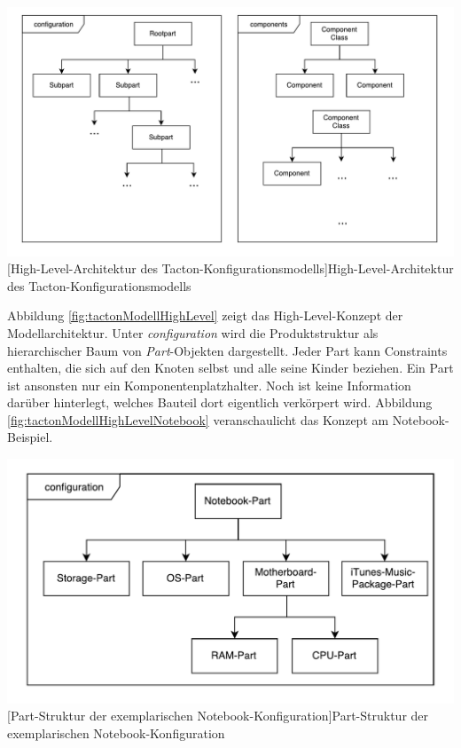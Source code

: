 \documentclass[11pt, a4paper, titlepage, listof=totoc, bibliography=totoc, index=totoc, twoside, openright, headings=normal, draft]{scrreprt}
\begin{document}
\vspace{1em}
\begin{minipage}{\linewidth}
	\centering
	\includegraphics[width=1\linewidth]{Abbildungen/tactonModellHighLevel.pdf}
	[High-Level-Architektur des Tacton-Konfigurationsmodells]{High-Level-Architektur des Tacton-Konfigurationsmodells}
	\label{fig:tactonModellHighLevel}
\end{minipage}
\vspace{0.3em}

Abbildung \ref{fig:tactonModellHighLevel} zeigt das High-Level-Konzept der Modellarchitektur. Unter \emph{configuration} wird die Produktstruktur als hierarchischer Baum von \emph{Part}-Objekten dargestellt. Jeder Part kann Constraints enthalten, die sich auf den Knoten selbst und alle seine Kinder beziehen. Ein Part ist ansonsten nur ein Komponentenplatzhalter. Noch ist keine Information darüber hinterlegt, welches Bauteil dort eigentlich verkörpert wird. Abbildung \ref{fig:tactonModellHighLevelNotebook} veranschaulicht das Konzept am Notebook-Beispiel.

\vspace{1em}
\begin{minipage}{\linewidth}
	\centering
	\includegraphics[width=0.7\linewidth]{Abbildungen/tactonModellHighLevelNotebook.pdf}
	[Part-Struktur der exemplarischen Notebook-Konfiguration]{Part-Struktur der exemplarischen Notebook-Konfiguration}
	\label{fig:tactonModellHighLevelNotebook}
\end{minipage}
\vspace{0.3em}
\end{document}
